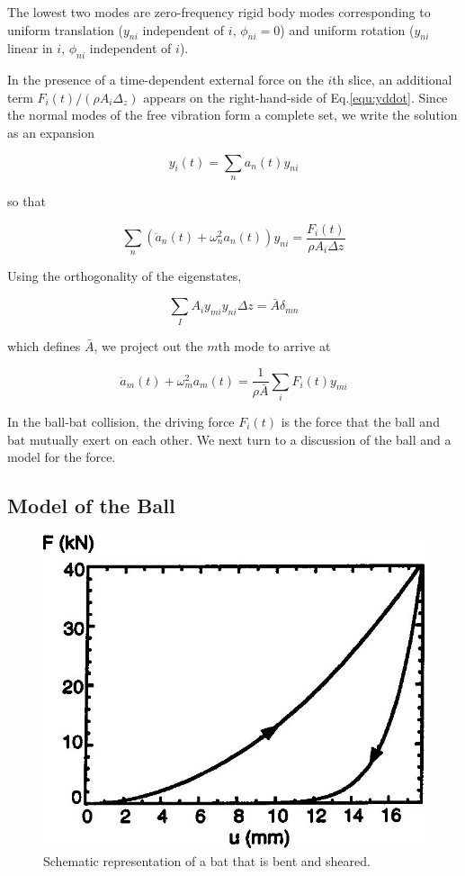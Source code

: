 \documentclass[12pt]{article}
\begin{document}
The lowest two modes are
zero-frequency rigid body modes corresponding to
uniform translation ($y_{ni}$ independent of $i$, $\phi_{ni}=0$) and
uniform rotation ($y_{ni}$ linear in $i$, $\phi_{ni}$ independent of $i$).

In the presence of a time-dependent external force on the $i$th slice,
an additional term $F_i(t)/(\rho A_i\Delta_z)$ appears on the right-hand-side of Eq.\ref{equ:yddot}.
Since the normal modes of the free vibration form a complete set, we write the solution as an expansion

$$y_i(t)=\sum_n a_n(t)y_{ni}$$

so that

\begin{equation}
\sum_n(\ddot{a}_n(t)+\omega^2_n a_n(t))y_{ni}=\frac{F_i(t)}{\rho A_i\Delta z}
\end{equation}

Using the orthogonality of the eigenstates,

$$\sum_I A_i y_{mi} y_{ni} \Delta z=\bar{A} \delta_{mn}$$

which defines $\bar{A}$,
we project out the $m$th mode to arrive at

\begin{equation}
\ddot{a}_m(t)+\omega^2_m a_m(t)=\frac{1}{\rho \bar{A}}\sum_iF_i(t)y_{mi}
\end{equation}

In the ball-bat collision, the driving force $F_i(t)$ is the force
that the ball and bat mutually exert on each other. We next
turn to a discussion of the ball and a model for the force.


\subsection{Model of the Ball}

\begin{center}
\begin{figure}[htpb]
\centering
\includegraphics[scale=0.8]{ballmodel}
\caption{Schematic representation of a bat that is bent
and sheared.}\label{fig:ballmodel}
\end{figure}
\end{center}
\end{document}
